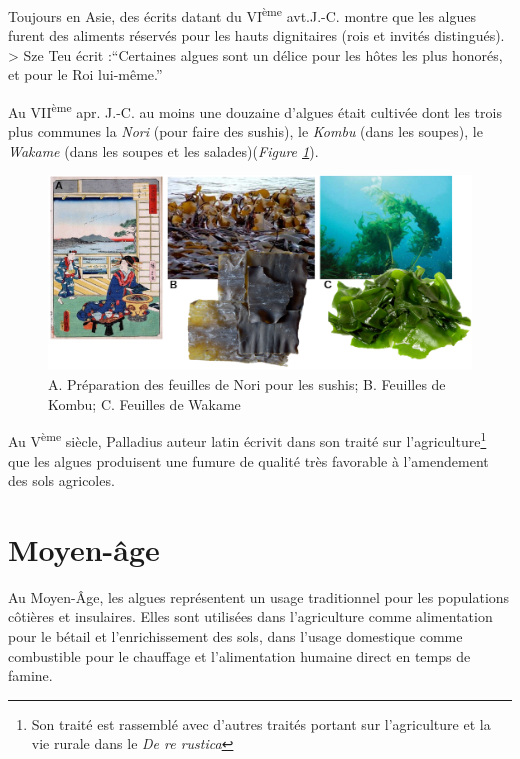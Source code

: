 \documentclass[
]{book}
\begin{document}
Toujours en Asie, des écrits datant du VI\textsuperscript{ème} avt.J.-C. montre que les algues furent des aliments réservés pour les hauts dignitaires (rois et invités distingués).
\textgreater{} Sze Teu écrit :``Certaines algues sont un délice pour les hôtes les plus honorés, et pour le Roi lui-même.''

Au VII\textsuperscript{ème} apr. J.-C. au moins une douzaine d'algues était cultivée dont les trois plus communes la \emph{Nori} (pour faire des sushis), le \emph{Kombu} (dans les soupes), le \emph{Wakame} (dans les soupes et les salades)(\emph{Figure \ref{fig:japonalgues}}).

\begin{figure}

{\centering \includegraphics[width=15.39in]{images/japon_algues} 

}

\caption{A. Préparation des feuilles de Nori pour les sushis; B. Feuilles de Kombu; C. Feuilles de Wakame }\label{fig:japonalgues}
\end{figure}

Au V\textsuperscript{ème} siècle, Palladius auteur latin écrivit dans son traité sur l'agriculture\footnote{Son traité est rassemblé avec d'autres traités portant sur l'agriculture et la vie rurale dans le \emph{De re rustica}} que les algues produisent une fumure de qualité très favorable à l'amendement des sols agricoles.

\hypertarget{moyen-uxe2ge}{%
\section{Moyen-âge}\label{moyen-uxe2ge}}

Au Moyen-Âge, les algues représentent un usage traditionnel pour les populations côtières et insulaires. Elles sont utilisées dans l'agriculture comme alimentation pour le bétail et l'enrichissement des sols, dans l'usage domestique comme combustible pour le chauffage et l'alimentation humaine direct en temps de famine.
\end{document}
